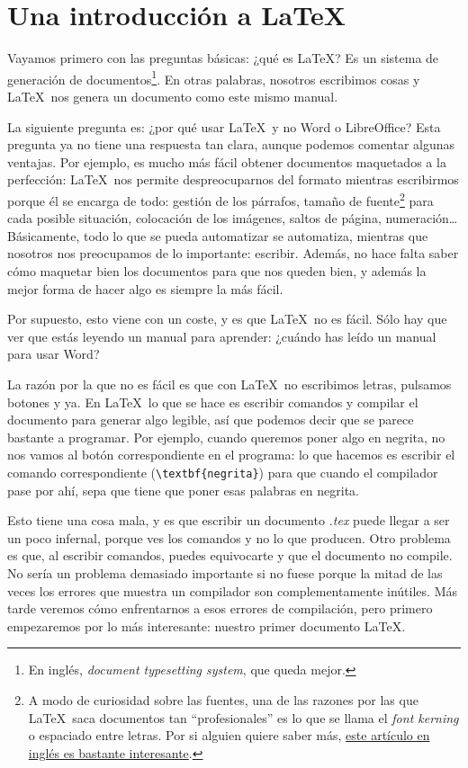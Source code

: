 \chapter{Una introducción a \LaTeX}
\label{chap:Introduccion}

Vayamos primero con las preguntas básicas: ¿qué es \LaTeX? Es un sistema de generación de documentos\footnote{En inglés, \textit{document typesetting system}, que queda mejor.}. En otras palabras, nosotros escribimos cosas y \LaTeX\ nos genera un documento como este mismo manual.

La siguiente pregunta es: ¿por qué usar \LaTeX\ y no Word o LibreOffice? Esta pregunta ya no tiene una respuesta tan clara, aunque podemos comentar algunas ventajas. Por ejemplo, es mucho más fácil obtener documentos maquetados a la perfección: \LaTeX\ nos permite despreocuparnos del formato mientras escribirmos porque él se encarga de todo: gestión de los párrafos, tamaño de fuente\footnote{A modo de curiosidad sobre las fuentes, una de las razones por las que \LaTeX\ saca documentos tan ``profesionales'' es lo que se llama el \textit{font kerning} o espaciado entre letras. Por si alguien quiere saber más, \href{http://nitens.org/taraborelli/latex}{este artículo en inglés es bastante interesante}.} para cada posible situación, colocación de los imágenes, saltos de página, numeración\ldots Básicamente, todo lo que se pueda automatizar se automatiza, mientras que nosotros nos preocupamos de lo importante: escribir. Además, no hace falta saber cómo maquetar bien los documentos para que nos queden bien, y además la mejor forma de hacer algo es siempre la más fácil.

Por supuesto, esto viene con un coste, y es que \LaTeX\ no es fácil. Sólo hay que ver que estás leyendo un manual para aprender: ¿cuándo has leído un manual para usar Word?

La razón por la que no es fácil es que con \LaTeX\ no escribimos letras, pulsamos botones y ya. En \LaTeX\ lo que se hace es escribir comandos y compilar el documento para generar algo legible, así que podemos decir que se parece bastante a programar. Por ejemplo, cuando queremos poner algo en negrita, no nos vamos al botón correspondiente en el programa: lo que hacemos es escribir el comando correspondiente (\verb|\textbf{negrita}|) para que cuando el compilador pase por ahí, sepa que tiene que poner esas palabras en negrita.

Esto tiene una cosa mala, y es que escribir un documento \textit{.tex} puede llegar a ser un poco infernal, porque ves los comandos y no lo que producen. Otro problema es que, al escribir comandos, puedes equivocarte y que el documento no compile. No sería un problema demasiado importante si no fuese porque la mitad de las veces los errores que muestra un compilador son complementamente inútiles. Más tarde veremos cómo enfrentarnos a esos errores de compilación, pero primero empezaremos por lo más interesante: nuestro primer documento \LaTeX{}.

